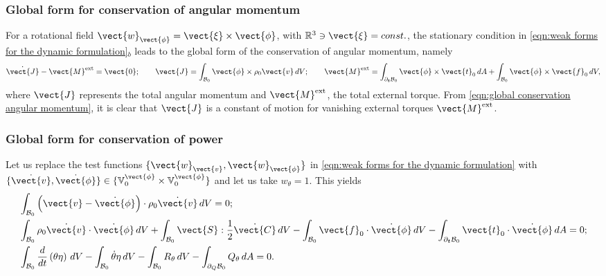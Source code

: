 \subsubsection{Global form for conservation of angular momentum}\label{sec:conservation angular momentum global}

For a rotational field $\vect{w}_{\vect{\phi}} = \vect{\xi}\times\vect{\phi}$, with $\mathbb{R}^3\ni\vect{\xi}=const.$, the stationary condition in \eqref{eqn:weak forms for the dynamic formulation}$_b$ leads to the global form of the conservation of angular momentum, namely
%
\begin{equation}\label{eqn:global conservation angular momentum}
%
\dot{\vect{J}} - \vect{M}^{\text{ext}} = \vect{0};\qquad
%
\vect{J}= \int_{\mathcal{B}_0}\vect{\phi}\times\rho_0{\vect{v}}\,dV;\qquad
%
\vect{M}^{\text{ext}} =    
\int_{\partial_{\boldsymbol{t}}\mathcal{B}_0}\vect{\phi}\times\vect{t}_0\,dA
+\int_{\mathcal{B}_0}\vect{\phi}\times\vect{f}_0\,dV,
\end{equation}
%
where $\vect{J}$ represents the total angular momentum and $\vect{M}^{\text{ext}}$, the total external torque. 
From \eqref{eqn:global conservation angular momentum}, it is clear that $\vect{J}$ is a constant of motion for vanishing external torques $\vect{M}^{\text{ext}}$. 


\subsubsection{Global form for conservation of power}\label{eqn:conservation of energy}

Let us replace the test functions
$\{\vect{w}_{\vect{v}},\vect{w}_{\vect{\phi}}\}$ in \eqref{eqn:weak forms for the dynamic formulation} with $\{\dot{\vect{v}},\dot{\vect{\phi}}\}\in\{\mathbb{V}_0^{\vect{\phi}}\times\mathbb{V}_0^{\vect{\phi}}\}$ and let us take $w_{\theta}=1$. 
This yields
%
\begin{equation}\label{eqn:weak forms for the dynamic formulation Dirichlet bcs}
\begin{aligned}
&\int_{\mathcal{B}_0}\left(\vect{v} - \dot{\vect{\phi}}\right)\cdot\rho_0\dot{\vect{v}}\,dV=0;\\
%
&\int_{\mathcal{B}_0}\rho_0\dot{\vect{v}}\cdot\dot{\vect{\phi}}\,dV + \int_{\mathcal{B}_0}\vect{S}:\frac{1}{2}\dot{\vect{C}}\,dV-  \int_{\mathcal{B}_0}\vect{f}_0\cdot\dot{\vect{\phi}}\,dV-
\int_{\partial_{\boldsymbol{t}}\mathcal{B}_0}\vect{t}_0\cdot\dot{\vect{\phi}}\,dA=0 ;\\
%
&\int_{\mathcal{B}_0}\frac{d}{dt}\left(\theta\eta\right)\,dV - \int_{\mathcal{B}_0}\dot{\theta}\eta\,dV - \int_{\mathcal{B}_0}R_{\theta}\,dV - \int_{\partial_Q\mathcal{B}_0}Q_{\theta}\,dA=0.
%
\end{aligned}
\end{equation}

